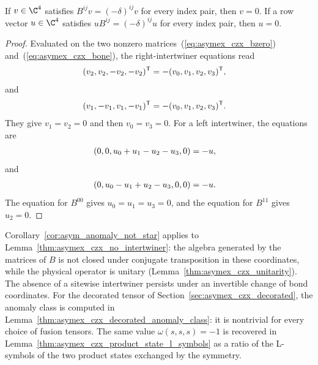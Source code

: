\begin{lemma}
    \label{thm:asymex_czx_no_intertwiner}
    \leanok
    If $v\in\C^4$ satisfies $B^{ij}v=(-\delta)^{ij}v$ for every index pair,
    then $v=0$. If a row vector $u\in\C^4$ satisfies
    $uB^{ij}=(-\delta)^{ij}u$ for every index pair, then $u=0$.
\end{lemma}

\begin{proof}
    \leanok
    Evaluated on the two nonzero matrices~(\ref{eq:asymex_czx_bzero})
    and~(\ref{eq:asymex_czx_bone}), the right-intertwiner equations read
    \begin{align}
        (v_2,v_2,-v_2,-v_2)^{\mathsf T}
         & =-(v_0,v_1,v_2,v_3)^{\mathsf T},
        \notag
    \end{align}
    and
    \begin{align}
        (v_1,-v_1,v_1,-v_1)^{\mathsf T}
         & =-(v_0,v_1,v_2,v_3)^{\mathsf T}.
        \notag
    \end{align}
    They give $v_1=v_2=0$ and then $v_0=v_3=0$.
    For a left intertwiner, the equations are
    \begin{align}
        (0,0,u_0+u_1-u_2-u_3,0) & =-u,
        \notag
    \end{align}
    and
    \begin{align}
        (0,u_0-u_1+u_2-u_3,0,0) & =-u.
        \notag
    \end{align}
    The equation for $B^{00}$ gives $u_0=u_1=u_3=0$,
    and the equation for $B^{11}$ gives $u_2=0$.
\end{proof}

\begin{remark}
    \label{rem:asymex_czx_anomaly}
    Corollary~\ref{cor:asym_anomaly_not_star} applies to
    Lemma~\ref{thm:asymex_czx_no_intertwiner}: the algebra generated by
    the matrices of $B$ is not closed under conjugate transposition in
    these coordinates, while the physical operator is unitary
    (Lemma~\ref{thm:asymex_czx_unitarity}). The absence of a sitewise
    intertwiner persists under an invertible change of bond coordinates.
    For the decorated tensor of Section~\ref{sec:asymex_czx_decorated}, the
    anomaly class is computed in
    Lemma~\ref{thm:asymex_czx_decorated_anomaly_class}: it is
    nontrivial for every choice of fusion tensors. The same value
    $\omega(s,s,s)=-1$ is recovered in
    Lemma~\ref{thm:asymex_czx_product_state_l_symbols} as a ratio of the
    L-symbols of the two product states exchanged by the symmetry.
\end{remark}


